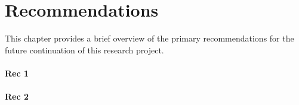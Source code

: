 \chapter{Recommendations}
\label{chapter:rec}

This chapter provides a brief overview of the primary recommendations for the future continuation of this research project.

\subsubsection*{Rec 1}

\subsubsection*{Rec 2}
